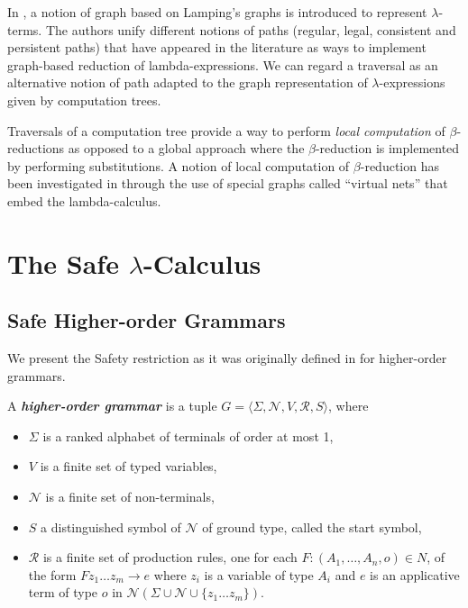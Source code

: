 \documentclass{llncs}
\newcommand\defname[1]{{\bf\em #1}\index{#1}}
\newcommand\union{\cup}
\begin{document}
In \cite{DBLP:conf/lics/AspertiDLR94}, a notion of graph based on
Lamping's graphs \cite{lamping} is introduced to represent
$\lambda$-terms. The authors unify different notions of paths
(regular, legal, consistent and persistent paths) that have appeared
in the literature as ways to implement graph-based reduction of
lambda-expressions. We can regard a traversal as an alternative
notion of path adapted to the graph representation of
$\lambda$-expressions given by computation trees.

Traversals of a computation tree provide a way
to perform \emph{local computation} of $\beta$-reductions as opposed
to a global approach where the $\beta$-reduction is implemented by
performing substitutions. A notion of local computation of
$\beta$-reduction has been investigated in
\cite{DanosRegnier-Localandasynchronou} through the use of special
graphs called ``virtual nets'' that embed the lambda-calculus.


\section{The Safe $\lambda$-Calculus}

\subsection{Safe Higher-order Grammars}
We present the Safety restriction as it was originally defined in \cite{KNU02} for higher-order grammars.

\begin{definition}
A \defname{higher-order grammar} is a tuple $G =
\langle \Sigma, \mathcal{N}, V, \mathcal{R}, S \rangle$, where
\begin{itemize}
\item $\Sigma$ is a ranked alphabet of terminals of order at most 1,
\item $V$ is a finite set of typed variables,
\item $\mathcal{N}$ is a finite set of non-terminals,
\item $S$ a distinguished symbol of $\mathcal{N}$ of ground type, called the start symbol,
\item $\mathcal{R}$ is a finite set of production rules, one for each $F : (A_1, \ldots, A_n, o) \in N$, of the form
$ F z_1 \ldots z_m \rightarrow e$
where $z_i$ is a variable of type $A_i$ and $e$ is an applicative
term of type $o$ in $\mathcal{N}(\Sigma \union \mathcal{N} \union
\{z_1 \ldots z_m \} )$.
\end{itemize}
\end{definition}
\end{document}
